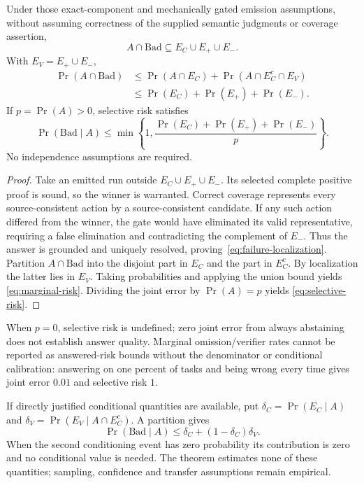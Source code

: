 \begin{theorem}
\label{thm:risk}
Under those exact-component and mechanically gated emission assumptions,
without assuming correctness of the supplied semantic judgments or coverage
assertion,
\begin{equation}
 A\cap\mathrm{Bad}\subseteq E_C\cup E_+\cup E_-.
 \label{eq:failure-localization}
\end{equation}
With $E_V=E_+\cup E_-$,
\begin{align}
 \Pr(A\cap\mathrm{Bad})
 &\le \Pr(A\cap E_C)
     +\Pr(A\cap E_C^c\cap E_V)\nonumber\\
 &\le \Pr(E_C)+\Pr(E_+)+\Pr(E_-).
 \label{eq:marginal-risk}
\end{align}
If $p=\Pr(A)>0$, selective risk satisfies
\begin{equation}
 \Pr(\mathrm{Bad}\mid A)
 \le \min\left\{1,
 \frac{\Pr(E_C)+\Pr(E_+)+\Pr(E_-)}{p}\right\}.
 \label{eq:selective-risk}
\end{equation}
No independence assumptions are required.
\end{theorem}
\begin{proof}
Take an emitted run outside $E_C\cup E_+\cup E_-$. Its selected complete
positive proof is sound, so the winner is warranted. Correct coverage
represents every source-consistent action by a source-consistent candidate.
If any such action differed from the winner, the gate would have eliminated
its valid representative, requiring a false elimination and contradicting
the complement of $E_-$. Thus the answer is grounded and uniquely resolved,
proving~\eqref{eq:failure-localization}. Partition $A\cap\mathrm{Bad}$ into
the disjoint part in $E_C$ and the part in $E_C^c$. By localization the latter
lies in $E_V$. Taking probabilities and applying the union bound yields
\eqref{eq:marginal-risk}. Dividing the joint error by $\Pr(A)=p$ yields
\eqref{eq:selective-risk}.
\end{proof}

When $p=0$, selective risk is undefined; zero joint error from always
abstaining does not establish answer quality. Marginal omission/verifier
rates cannot be reported as answered-risk bounds without the denominator or
conditional calibration: answering on one percent of tasks and being wrong
every time gives joint error $0.01$ and selective risk $1$.

If directly justified conditional quantities are available, put
$\delta_C=\Pr(E_C\mid A)$ and
$\delta_V=\Pr(E_V\mid A\cap E_C^c)$. A partition gives
\begin{equation}
 \Pr(\mathrm{Bad}\mid A)
 \le\delta_C+(1-\delta_C)\delta_V.
\end{equation}
When the second conditioning event has zero probability its contribution is
zero and no conditional value is needed. The theorem estimates none of these
quantities; sampling, confidence and transfer assumptions remain empirical.

